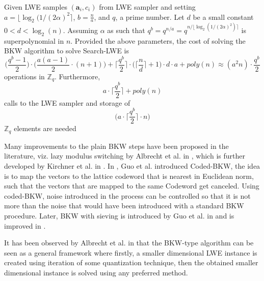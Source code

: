 \begin{theorem} \cite{albrecht2014algebraic,c54b603f579b48a08b698bde47b71455}
    Given LWE samples $(\textbf{a}_i,c_i)$ from LWE sampler and setting $a=\lfloor \log_2{(1/(2\alpha)^2} \rceil$, $b=\frac{n}{a}$, and $q$, a prime number. Let $d$ be a small constant $0<d<\log_2{(n)}$. Assuming $\alpha$ as such that $q^b=q^{n/a}=q^{n/\lfloor \log_2(1/(2\alpha)^2) \rceil}$ is superpolynomial in $n$. Provided the above parameters, the cost of solving the BKW algorithm to solve Search-LWE is
    \begin{equation*}
        \Big(\frac{q^b-1}{2}\Big) \cdot \Big(\frac{a(a-1)}{2}\cdot(n+1)\Big) + \Big\lceil \frac{q^b}{2} \Big \rceil \cdot \Big(\Big\lceil \frac{n}{d} \Big\rceil +1 \Big)\cdot d \cdot a + poly(n) \approx (a^2n)\cdot \frac{q^b}{2}
    \end{equation*}
    operations in $\mathbb{Z}_q$. Furthermore,
    \begin{equation*}
        a\cdot \Big\lceil\frac{q^b}{2} \Big\rceil +poly(n)
    \end{equation*}
    calls to the LWE sampler and storage of
    \begin{equation*}
        \Big( a \cdot \Big \lceil \frac{q^b}{2} \Big \rceil \cdot n \Big)
    \end{equation*}
    $\mathbb{Z}_q$ elements are needed
\end{theorem}

Many improvements to the plain BKW steps have been proposed in the literature, viz. lazy modulus switching by Albrecht et al. in \cite{albrecht2014lazy}, which is further developed by Kirchner et al. in \cite{kirchner2015improved}. In \cite{guo2015coded}, Guo et al. introduced Coded-BKW, the idea is to map the vectors to the lattice codeword that is nearest in Euclidean norm, such that the vectors that are mapped to the same Codeword get canceled. Using coded-BKW, noise introduced in the process can be controlled so that it is not more than the noise that would have been introduced with a standard BKW procedure. Later, BKW with sieving is introduced by Guo et al. in \cite{guo2017coded} and is improved in \cite{guo2019asymptotics,maartensson2019asymptotic}.

It has been observed by Albrecht et al. in \cite{albrecht2017dual} that the BKW-type algorithm can be seen as a general framework where firstly, a smaller dimensional LWE instance is created using iteration of some quantization technique, then the obtained smaller dimensional instance is solved using any preferred method.



